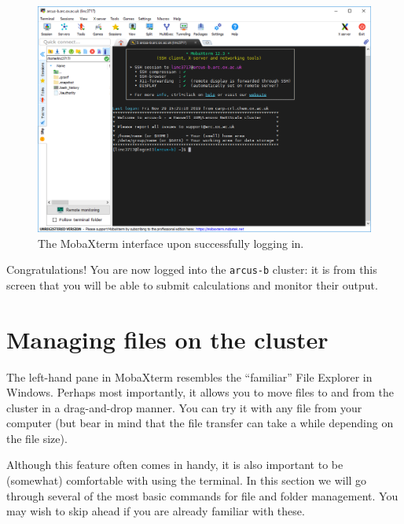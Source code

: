 \documentclass[10pt]{article}
\begin{document}
\begin{figure}[H]
    \centering
    \includegraphics[scale=0.38]{./img/loggedin}
    \caption{The MobaXterm interface upon successfully logging in.}
    \label{fig:loggedin}
\end{figure}


Congratulations! You are now logged into the \texttt{arcus-b} cluster: it is from this screen that you will be able to submit calculations and monitor their output.

\section{Managing files on the cluster}

The left-hand pane in MobaXterm resembles the ``familiar'' File Explorer in Windows. Perhaps most importantly, it allows you to move files to and from the cluster in a drag-and-drop manner. You can try it with any file from your computer (but bear in mind that the file transfer can take a while depending on the file size).

Although this feature often comes in handy, it is also important to be (somewhat) comfortable with using the terminal. In this section we will go through several of the most basic commands for file and folder management. You may wish to skip ahead if you are already familiar with these.
\end{document}
